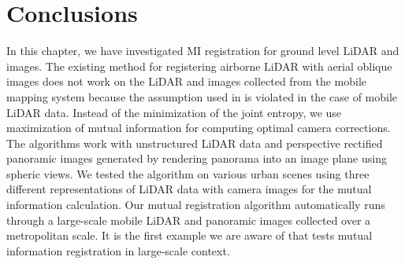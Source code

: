 %


\section{Conclusions}

In this chapter, we have investigated MI registration for ground level LiDAR and images. The existing method \cite{MastinFisher09} for registering airborne LiDAR with aerial oblique images does not
work on the LiDAR and images collected from the mobile mapping system because the assumption used in \cite{MastinFisher09} is violated in the case of mobile LiDAR data. Instead of the minimization of the joint entropy, we use maximization of mutual
information for computing optimal camera corrections. The algorithms work with unstructured LiDAR data and perspective rectified panoramic images generated by rendering panorama into an image plane using spheric views. We tested the algorithm on various urban scenes using three different representations of LiDAR data with camera images for the mutual information calculation. Our mutual registration algorithm automatically runs through a large-scale mobile LiDAR and panoramic images collected over a metropolitan scale.  It is the first example we are aware of that tests mutual information registration in large-scale context. 






























